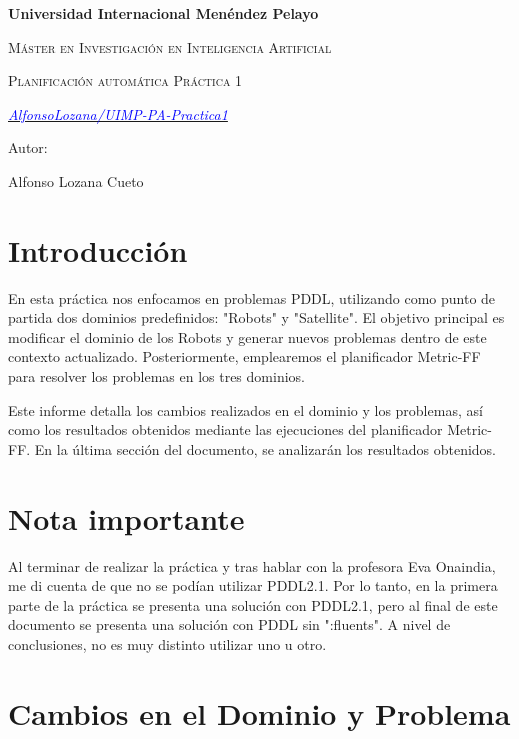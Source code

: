 \documentclass{article}
\begin{document}
\begin{titlepage}
    \centering
    {\bfseries\LARGE Universidad Internacional Menéndez Pelayo  \par}
    \vspace{1cm}
    {\scshape\Large Máster en Investigación en Inteligencia Artificial    \par}
    \vspace{3cm}
    {\scshape\Huge Planificación automática Práctica 1 \par}
    \vspace{3cm}
    {\itshape\Large \href{https://github.com/AlfonsoLozana/UIMP-PA-Practica1}{\textcolor{blue}{AlfonsoLozana/UIMP-PA-Practica1}} \par} %
    \vfill
    {\Large Autor: \par}
    {\Large Alfonso Lozana Cueto \par}
    \vfill
\end{titlepage}

\section{Introducción}
En esta práctica nos enfocamos en problemas PDDL, utilizando como punto de partida dos dominios predefinidos: "Robots" y "Satellite".
El objetivo principal es modificar el dominio de los Robots y generar nuevos problemas dentro de este contexto actualizado. 
Posteriormente, emplearemos el planificador Metric-FF para resolver los problemas en los tres dominios.

Este informe detalla los cambios realizados en el dominio y los problemas, así como los resultados obtenidos mediante las ejecuciones 
del planificador Metric-FF. En la última sección del documento, se analizarán los resultados obtenidos.

\section{Nota importante}
Al terminar de realizar la práctica y tras hablar con la profesora Eva Onaindia, me di cuenta de que no se podían utilizar PDDL2.1. 
Por lo tanto, en la primera parte de la práctica se presenta una solución con PDDL2.1, pero al final de este documento se presenta 
una solución con PDDL sin ":fluents". A nivel de conclusiones, no es muy distinto utilizar uno u otro. 

 \section{Cambios en el Dominio y Problema}
\end{document}
